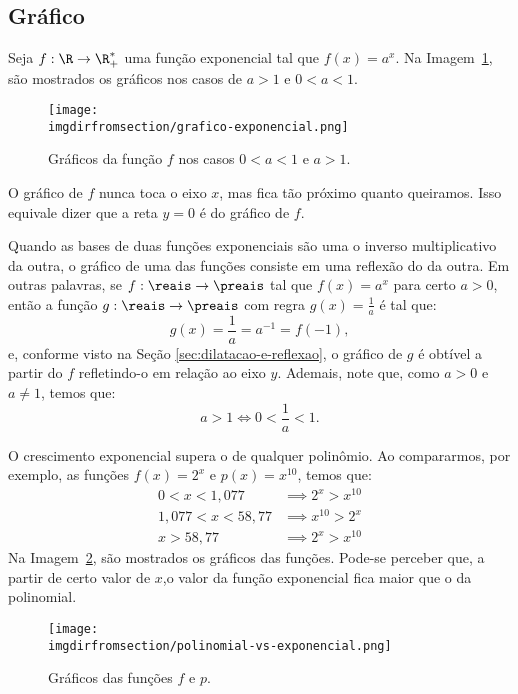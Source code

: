 \subsection{Gráfico}

\begin{example}
    Seja $f: \R \to \R_+^*$ uma função exponencial tal que $f(x) = a^x$. Na Imagem~\ref{img:graficos-exponencial}, são mostrados os gráficos nos casos de $a > 1$ e $0 < a < 1$.
    \begin{figure}[H]
        \centering
        \texttt{[image: \\imgdirfromsection/grafico-exponencial.png]}
        \caption{Gráficos da função $f$ nos casos $0<a<1$ e $a>1$.}
        \label{img:graficos-exponencial}
    \end{figure}
    O gráfico de $f$ nunca toca o eixo $x$, mas fica tão próximo quanto queiramos. Isso equivale dizer que a reta $y=0$ é  do gráfico de $f$.
\end{example}

\begin{remark}
    Quando as bases de duas funções exponenciais são uma o inverso multiplicativo da outra, o gráfico de uma das funções consiste em uma reflexão do da outra. Em outras palavras, se $f:\reais \to \preais$ tal que $f(x) = a^x $ para certo $a > 0$, então a função $g:\reais \to \preais$ com regra $g(x) = \frac 1 a$ é tal que:
    \[
        g(x) = \frac 1 a = a^{-1} = f(-1),    
    \]
    e, conforme visto na Seção \ref{sec:dilatacao-e-reflexao}, o gráfico de $g$ é obtível a partir do $f$ refletindo-o em relação ao eixo $y$. Ademais, note que, como $a > 0$ e $a \ne 1$, temos que:
    \[
        a > 1 \iff 0 < \frac{1}{a} < 1.
    \]
\end{remark}

\begin{example}
    O crescimento exponencial supera o de qualquer polinômio. Ao compararmos, por exemplo, as funções $f(x) = 2^x$ e $p(x)=x^{10}$, temos que:
    \begin{align*}
        0<x<1{,}077 & \implies  2^x > x^{10} \\
        1{,}077 < x < 58{,}77 & \implies  x^{10} > 2^x \\
        x>58{,}77 & \implies  2^x > x^{10}
    \end{align*}
    Na Imagem~\ref{img:polinomial-vs-exponencial}, são mostrados os gráficos das funções. Pode-se perceber que, a partir de certo valor de $x$,o valor da função exponencial fica maior que o da polinomial. 
    \begin{figure}[H]
        \centering
        \texttt{[image: \\imgdirfromsection/polinomial-vs-exponencial.png]}
        \caption{Gráficos das funções $f$ e $p$.}
        \label{img:polinomial-vs-exponencial}
    \end{figure}
\end{example}

